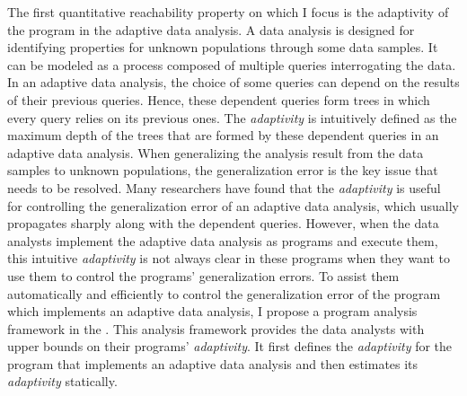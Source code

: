 The first quantitative reachability property on which
 I focus is the adaptivity of the program in the adaptive data analysis.
    A data analysis is designed for identifying properties for unknown populations 
 through some data samples.
It can be modeled as a process composed of 
multiple queries interrogating the data.
 In an adaptive data analysis, the choice of some queries can depend on the results of their previous queries. 
 Hence, these dependent queries form trees in which every query relies on its previous ones.
The \emph{adaptivity} is intuitively defined as the maximum depth of the trees that are formed by these dependent queries
in an adaptive data analysis.
When generalizing the analysis result from the data samples to unknown populations, 
the generalization error is the key issue that needs to be resolved.
 Many researchers have found that the
 \emph{adaptivity} is useful for controlling the generalization error of an adaptive data analysis,
 which usually propagates sharply along with the dependent queries. 
 However, when the data analysts implement the adaptive
 data analysis as programs and execute them,
this intuitive \emph{adaptivity} is not always clear in these programs
when they want to use them to control the programs' generalization errors.
    To assist them automatically and efficiently 
to control the generalization error of the program which implements an adaptive
data analysis,
 I propose a program analysis framework in the .
 This analysis framework
 provides the data analysts with upper bounds on their programs' \emph{adaptivity}.
It first defines the \emph{adaptivity} for 
 the program that implements an adaptive data analysis
 and then
 estimates its \emph{adaptivity} statically.

